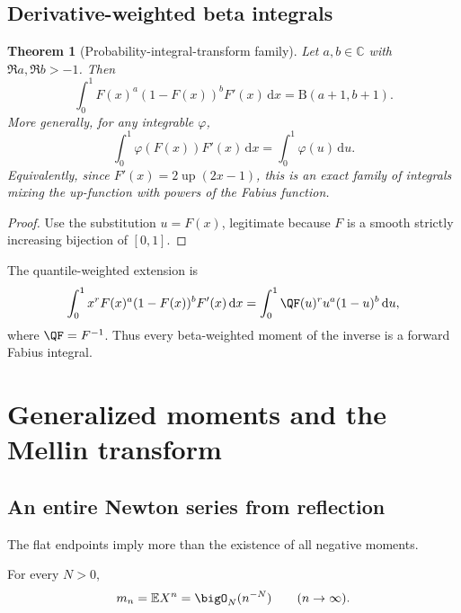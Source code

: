 \documentclass[11pt,oneside]{article}
\newtheorem{theorem}{Theorem}[section]
\theoremstyle{definition}
\theoremstyle{remark}
\newcommand{\Up}{\operatorname{up}}
\newcommand{\E}{\mathbb E}
\newcommand{\C}{\mathbb C}
\newcommand{\dd}{\,\mathrm d}
\newcommand{\1}{\mathbf 1}
\begin{document}
\subsection{Derivative-weighted beta integrals}

\begin{theorem}[Probability-integral-transform family]
\label{p8:thm:beta-family}
Let \(a,b\in\C\) with \(\Re a,\Re b>-1\).  Then
\begin{equation}
 \boxed{\int_0^1 F(x)^a(1-F(x))^bF'(x)\dd x
 =\mathrm B(a+1,b+1).}
 \label{p8:eq:F-beta}
\end{equation}
More generally, for any integrable \(\varphi\),
\begin{equation}
 \int_0^1\varphi(F(x))F'(x)\dd x=\int_0^1\varphi(u)\dd u.
 \label{p8:eq:PIT}
\end{equation}
Equivalently, since \(F'(x)=2\Up(2x-1)\), this is an exact family of integrals
mixing the up-function with powers of the Fabius function.  \statusprovedPartll
\end{theorem}

\begin{proof}
Use the substitution \(u=F(x)\), legitimate because \(F\) is a smooth strictly
increasing bijection of \([0,1]\).
\end{proof}

The quantile-weighted extension is
\begin{equation}
 \int_0^1x^rF(x)^a(1-F(x))^bF'(x)\dd x
 =\int_0^1\QF(u)^r u^a(1-u)^b\dd u,
 \label{p8:eq:weighted-beta-quantile}
\end{equation}
where \(\QF=F^{-1}\).  Thus every beta-weighted moment of the inverse is a
forward Fabius integral.

\section{Generalized moments and the Mellin transform}
\label{p8:sec:mellin}

\subsection{An entire Newton series from reflection}

The flat endpoints imply more than the existence of all negative moments.

\begin{lemma}
\label{p8:lem:moment-decay}
For every \(N>0\),
\begin{equation}
 m_n=\E X^n=\bigO_N(n^{-N})\qquad(n\to\infty).
 \label{p8:eq:moment-superpoly}
\end{equation}
\statusprovedPartll
\end{lemma}
\end{document}
